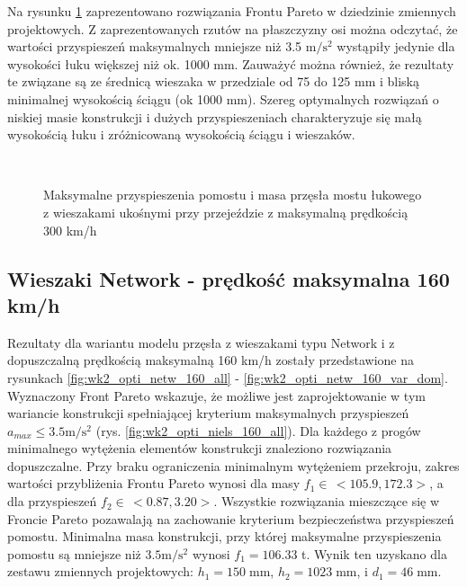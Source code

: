 Na rysunku \ref{fig:wk2_opti_niels_300_var_dom} zaprezentowano rozwiązania Frontu Pareto w dziedzinie zmiennych projektowych. Z zaprezentowanych rzutów na płaszczyzny osi można odczytać, że wartości przyspieszeń maksymalnych mniejsze niż  3.5 $\mathrm{m/s^2}$ wystąpiły jedynie dla wysokości łuku większej niż ok. 1000 mm. Zauważyć można również, że rezultaty te związane są ze średnicą wieszaka w przedziale od 75 do 125 mm i bliską minimalnej wysokością ściągu (ok 1000 mm). Szereg optymalnych rozwiązań o niskiej masie konstrukcji i dużych przyspieszeniach charakteryzuje się małą wysokością łuku i zróżnicowaną wysokością ściągu i wieszaków.


\begin{figure}[hbt!]
	\centering
	\\
	\captionsetup{justification=centering}
	\caption{Maksymalne przyspieszenia pomostu i masa przęsła mostu łukowego z wieszakami ukośnymi przy przejeździe z maksymalną prędkością 300 km/h}
	\label{fig:wk2_opti_niels_300_var_dom}
\end{figure}





\pagebreak[4]
\subsection{Wieszaki Network - prędkość maksymalna 160 km/h}

Rezultaty dla wariantu modelu przęsła z wieszakami typu Network i z dopuszczalną prędkością maksymalną 160 km/h zostały przedstawione na rysunkach \ref{fig:wk2_opti_netw_160_all} - \ref{fig:wk2_opti_netw_160_var_dom}. Wyznaczony Front Pareto wskazuje, że możliwe jest zaprojektowanie w tym wariancie konstrukcji spełniającej kryterium maksymalnych przyspieszeń $a_{max}\le 3.5 \mathrm{m/s^2}$ (rys. \ref{fig:wk2_opti_niels_160_all}). Dla każdego z progów minimalnego wytężenia elementów konstrukcji znaleziono rozwiązania dopuszczalne. Przy braku ograniczenia minimalnym wytężeniem przekroju, zakres wartości przybliżenia Frontu Pareto wynosi dla masy $f_1 \in\,<105.9,172.3>$, a dla przyspieszeń $f_2 \in\,<0.87,3.20>$. Wszystkie rozwiązania mieszczące się w Froncie Pareto pozawalają na zachowanie kryterium bezpieczeństwa przyspieszeń pomostu. Minimalna masa konstrukcji, przy której maksymalne przyspieszenia pomostu są mniejsze niż $3.5 \mathrm{m/s^2}$ wynosi $f_1 = 106.33$ t. Wynik ten uzyskano dla zestawu zmiennych projektowych: $h_1 = 150\;\mathrm{mm}$, $h_2 = 1023\;\mathrm{mm}$, i $d_1 = 46\;\mathrm{mm}$.

